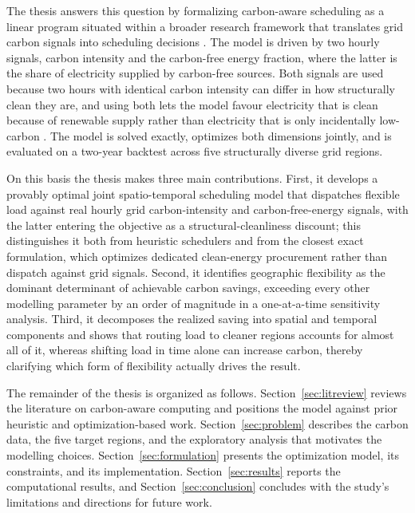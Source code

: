 The thesis answers this question by formalizing carbon-aware scheduling as a linear program situated within a broader research framework that translates grid carbon signals into scheduling decisions \citep{colangelo2025}. The model is driven by two hourly signals, carbon intensity and the carbon-free energy fraction, where the latter is the share of electricity supplied by carbon-free sources. Both signals are used because two hours with identical carbon intensity can differ in how structurally clean they are, and using both lets the model favour electricity that is clean because of renewable supply rather than electricity that is only incidentally low-carbon \citep{riepin2024cfe247costs, chien2023reducing}. The model is solved exactly, optimizes both dimensions jointly, and is evaluated on a two-year backtest across five structurally diverse grid regions.

On this basis the thesis makes three main contributions. First, it develops a provably optimal joint spatio-temporal scheduling model that dispatches flexible load against real hourly grid carbon-intensity and carbon-free-energy signals, with the latter entering the objective as a structural-cleanliness discount; this distinguishes it both from heuristic schedulers and from the closest exact formulation, which optimizes dedicated clean-energy procurement rather than dispatch against grid signals. Second, it identifies geographic flexibility as the dominant determinant of achievable carbon savings, exceeding every other modelling parameter by an order of magnitude in a one-at-a-time sensitivity analysis. Third, it decomposes the realized saving into spatial and temporal components and shows that routing load to cleaner regions accounts for almost all of it, whereas shifting load in time alone can increase carbon, thereby clarifying which form of flexibility actually drives the result.

The remainder of the thesis is organized as follows. Section~\ref{sec:litreview} reviews the literature on carbon-aware computing and positions the model against prior heuristic and optimization-based work. Section~\ref{sec:problem} describes the carbon data, the five target regions, and the exploratory analysis that motivates the modelling choices. Section~\ref{sec:formulation} presents the optimization model, its constraints, and its implementation. Section~\ref{sec:results} reports the computational results, and Section~\ref{sec:conclusion} concludes with the study's limitations and directions for future work.
